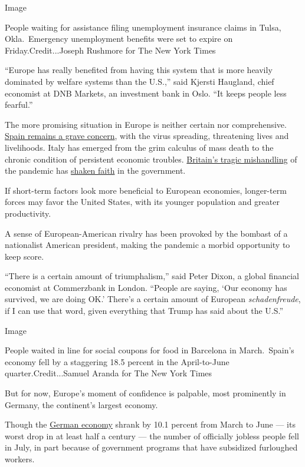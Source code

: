 Image

People waiting for assistance filing unemployment insurance claims in
Tulsa, Okla.~Emergency unemployment benefits were set to expire on
Friday.Credit...Joseph Rushmore for The New York Times

``Europe has really benefited from having this system that is more
heavily dominated by welfare systems than the U.S.,'' said Kjersti
Haugland, chief economist at DNB Markets, an investment bank in Oslo.
``It keeps people less fearful.''

The more promising situation in Europe is neither certain nor
comprehensive.
\href{https://www.nytimes3xbfgragh.onion/2020/07/23/world/europe/spain-coronavirus-reopening.html}{Spain
remains a grave concern}, with the virus spreading, threatening lives
and livelihoods. Italy has emerged from the grim calculus of mass death
to the chronic condition of persistent economic troubles.
\href{https://www.nytimes3xbfgragh.onion/2020/07/30/world/europe/UK-deaths-coronavirus-europe.html}{Britain's
tragic mishandling} of the pandemic has
\href{https://www.reuters.com/article/us-health-coronavirus-poll/uk-leads-fall-in-global-trust-in-government-covid-responses-poll-idUSKBN23B0H4}{shaken
faith} in the government.

If short-term factors look more beneficial to European economies,
longer-term forces may favor the United States, with its younger
population and greater productivity.

A sense of European-American rivalry has been provoked by the bombast of
a nationalist American president, making the pandemic a morbid
opportunity to keep score.

``There is a certain amount of triumphalism,'' said Peter Dixon, a
global financial economist at Commerzbank in London. ``People are
saying, `Our economy has survived, we are doing OK.' There's a certain
amount of European \emph{schadenfreude}, if I can use that word, given
everything that Trump has said about the U.S.''

Image

People waited in line for social coupons for food in Barcelona in
March.~Spain's economy fell by a staggering 18.5 percent in the
April-to-June quarter.Credit...Samuel Aranda for The New York Times

But for now, Europe's moment of confidence is palpable, most prominently
in Germany, the continent's largest economy.

Though the
\href{https://www.nytimes3xbfgragh.onion/2020/07/30/business/the-german-economy-had-its-biggest-slump-in-50-years.html}{German
economy} shrank by 10.1 percent from March to June --- its worst drop in
at least half a century --- the number of officially jobless people fell
in July, in part because of government programs that have subsidized
furloughed workers.

